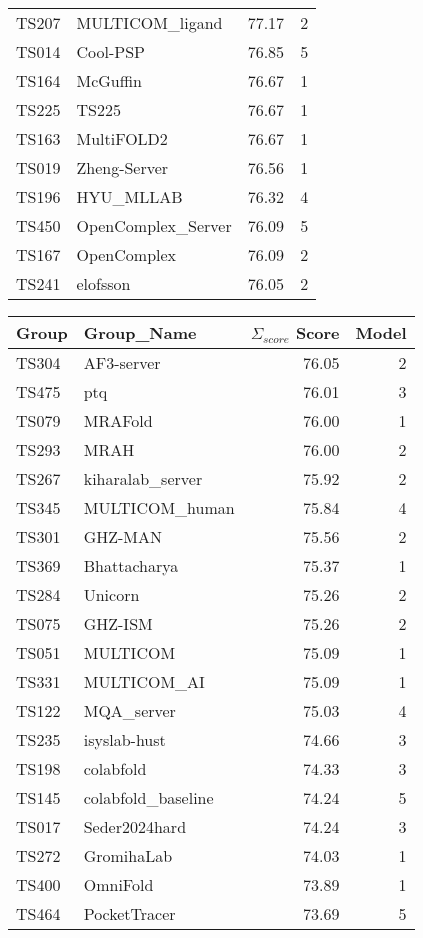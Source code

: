 \begin{table*}[ht]
\begin{minipage}[t]{0.48\textwidth}
\begin{tabular}{llrr}
TS207 & MULTICOM\_ligand & 77.17 & 2 \\ 
TS014 & Cool-PSP & 76.85 & 5 \\ 
TS164 & McGuffin & 76.67 & 1 \\ 
TS225 & TS225 & 76.67 & 1 \\ 
TS163 & MultiFOLD2 & 76.67 & 1 \\ 
TS019 & Zheng-Server & 76.56 & 1 \\ 
TS196 & HYU\_MLLAB & 76.32 & 4 \\ 
TS450 & OpenComplex\_Server & 76.09 & 5 \\ 
TS167 & OpenComplex & 76.09 & 2 \\ 
TS241 & elofsson & 76.05 & 2 \\ 
\bottomrule
\end{tabular}
\end{minipage}
\hfill
\begin{minipage}[t]{0.48\textwidth}
\centering
\begin{tabular}{llrr}
\toprule
Group & Group\_Name & $\Sigma_{score}$ Score & Model \\ 
\midrule
TS304 & AF3-server & 76.05 & 2 \\ 
TS475 & ptq & 76.01 & 3 \\ 
TS079 & MRAFold & 76.00 & 1 \\ 
TS293 & MRAH & 76.00 & 2 \\ 
TS267 & kiharalab\_server & 75.92 & 2 \\ 
TS345 & MULTICOM\_human & 75.84 & 4 \\ 
TS301 & GHZ-MAN & 75.56 & 2 \\ 
TS369 & Bhattacharya & 75.37 & 1 \\ 
TS284 & Unicorn & 75.26 & 2 \\ 
TS075 & GHZ-ISM & 75.26 & 2 \\ 
TS051 & MULTICOM & 75.09 & 1 \\ 
TS331 & MULTICOM\_AI & 75.09 & 1 \\ 
TS122 & MQA\_server & 75.03 & 4 \\ 
TS235 & isyslab-hust & 74.66 & 3 \\ 
TS198 & colabfold & 74.33 & 3 \\ 
TS145 & colabfold\_baseline & 74.24 & 5 \\ 
TS017 & Seder2024hard & 74.24 & 3 \\ 
TS272 & GromihaLab & 74.03 & 1 \\ 
TS400 & OmniFold & 73.89 & 1 \\ 
TS464 & PocketTracer & 73.69 & 5 \\ 

\end{tabular}
\end{minipage}
\end{table*}
